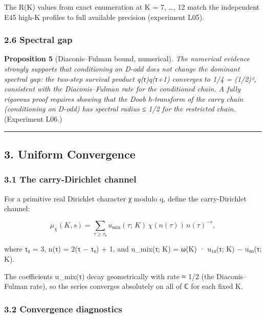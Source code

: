 \documentclass[
  11pt,
]{article}
\begin{document}
The R(K) values from exact enumeration at K = 7, \ldots, 12 match the
independent E45 high-K profiles to full available precision (experiment L05).

\subsubsection{2.6 Spectral gap}\label{spectral-gap}

\textbf{Proposition 5} (Diaconis--Fulman bound, numerical). \emph{The numerical
evidence strongly supports that conditioning on D-odd does not change the
dominant spectral gap: the two-step survival product q(τ)q(τ+1) converges to 1/4
= (1/2)², consistent with the Diaconis--Fulman rate for the conditioned chain. A
fully rigorous proof requires showing that the Doob h-transform of the carry
chain (conditioning on D-odd) has spectral radius ≤ 1/2 for the restricted
chain.} (Experiment L06.)

\begin{center}\rule{0.5\linewidth}{0.5pt}\end{center}

\newpage

\subsection{3. Uniform Convergence}\label{uniform-convergence}

\subsubsection{3.1 The carry-Dirichlet
channel}\label{the-carry-dirichlet-channel}

For a primitive real Dirichlet character χ modulo q, define the carry-Dirichlet
channel:

\[\mu_\chi(K, s) = \sum_{\tau \geq \tau_0} u_{\text{mix}}(\tau;\, K)\, \chi(n(\tau))\, n(\tau)^{-s},\]

where τ₀ = 3, n(τ) = 2(τ − τ₀) + 1, and u\_mix(τ; K) = ω(K) · u₁₀(τ; K) − u₀₀(τ;
K).

The coefficients u\_mix(τ) decay geometrically with rate ≈ 1/2 (the
Diaconis--Fulman rate), so the series converges absolutely on all of ℂ for each
fixed K.

\subsubsection{3.2 Convergence diagnostics}\label{convergence-diagnostics}
\end{document}
